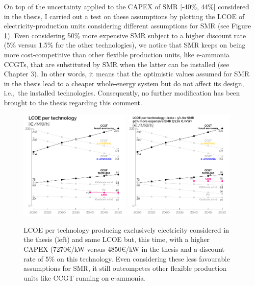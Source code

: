 \documentclass[12pt,a4paper]{article}
\def\ie{i.e.,\ }
\begin{document}
On top of the uncertainty applied to the CAPEX of SMR [-40\%, 44\%] considered in the thesis, I carried out a test on these assumptions by plotting the LCOE of electricity-production units considering different assumptions for SMR (see Figure \ref{fig:LCOE_comparison}). Even considering 50\% more expensive SMR subject to a higher discount rate (5\% versus 1.5\% for the other technologies), we notice that SMR keeps on being more cost-competitive than other flexible production units, like e-ammonia CCGTs, that are substituted by SMR when the latter can be installed (see Chapter 3). In other words, it means that the optimistic values assumed for SMR in the thesis lead to a cheaper whole-energy system but do not affect its design, \ie the installed technologies.  Consequently, no further modification has been brought to the thesis regarding this comment.

\begin{figure}[htbp!]
\centering
\includegraphics[width=0.49\textwidth]{LCOE_line_2.pdf}
\includegraphics[width=0.49\textwidth]{LCOE_line_3.pdf}
\label{fig:LCOE_comparison}
\caption{LCOE per technology producing exclusively electricity considered in the thesis (left) and same LCOE but, this time, with a higher CAPEX (7270€/kW versus 4850€/kW in the thesis and a discount rate of 5\% on this technology. Even considering these less favourable assumptions for SMR, it still outcompetes other flexible production units like CCGT running on e-ammonia.}
\end{figure}
\end{document}
